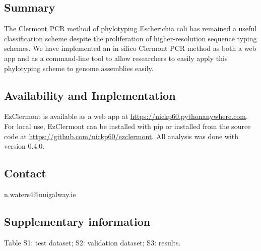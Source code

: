
\subsection*{Summary}
The Clermont PCR method of phylotyping Escherichia coli has remained a useful classification scheme despite the proliferation of higher-resolution sequence typing schemes.  We have implemented an in silico Clermont PCR method as both a web app and as a command-line tool to allow researchers to easily apply this phylotyping scheme to genome assemblies easily.
\subsection*{Availability and Implementation}
EzClermont is available as a web app at  \url{https://nickp60.pythonanywhere.com}.  For local use, EzClermont can be installed with pip or installed from the source code at \url{https://github.com/nickp60/ezclermont}. All analysis was done with version 0.4.0.
\subsection*{Contact}
n.waters4@nuigalway.ie
\subsection*{Supplementary information}
Table S1: test dataset; S2: validation dataset; S3: results.
